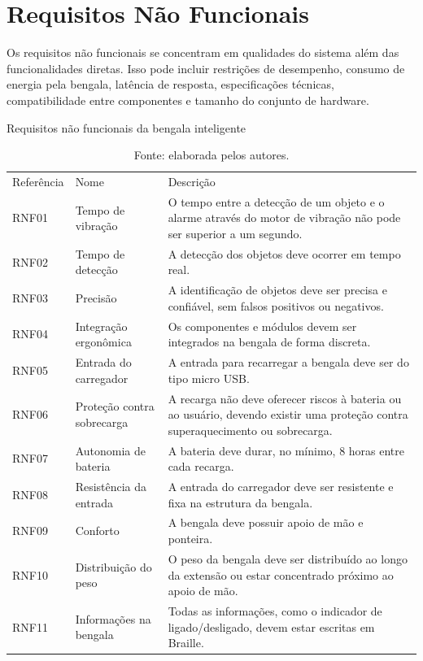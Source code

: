 \section{Requisitos Não Funcionais}
    Os requisitos não funcionais se concentram em qualidades do sistema além das funcionalidades diretas. Isso pode incluir restrições de desempenho, consumo de energia pela bengala, latência de resposta, especificações técnicas, compatibilidade entre componentes e tamanho do conjunto de hardware.


\begin{table}[!ht]    
    \captionsetup{width=1.0\textwidth} %
    \caption{Requisitos não funcionais da bengala inteligente}  
    \renewcommand{\arraystretch}{1.5} %
    \begin{tabular}{p{}p{}p{}} %
        \toprule
        Referência & Nome & Descrição \\
        RNF01 & Tempo de vibração & O tempo entre a detecção de um objeto e o alarme através do motor de vibração não pode ser superior a um segundo.   \\
        RNF02 & Tempo de detecção  & A detecção dos objetos deve ocorrer em tempo real. \\
        RNF03 & Precisão  &  A identificação de objetos deve ser precisa e confiável, sem falsos positivos ou negativos.  \\
        RNF04 & Integração ergonômica  &  Os componentes e módulos devem ser integrados na bengala de forma discreta.  \\
        RNF05 & Entrada do carregador  & A entrada para recarregar a bengala deve ser do tipo micro USB. \\
        RNF06 & Proteção contra sobrecarga  & A recarga não deve oferecer riscos à bateria ou ao usuário, devendo existir uma proteção contra superaquecimento ou sobrecarga.  \\
        RNF07 & Autonomia de bateria  &  A bateria deve durar, no mínimo, 8 horas entre cada recarga. \\
        RNF08 & Resistência da entrada  & A entrada do carregador deve ser resistente e fixa na estrutura da bengala. \\
        RNF09 & Conforto  &  A bengala deve possuir apoio de mão e ponteira.  \\
        RNF10 & Distribuição do peso &  O peso da bengala deve ser distribuído ao longo da extensão ou estar concentrado próximo ao apoio de mão.  \\
        RNF11 & Informações na bengala &  Todas as informações, como o indicador de ligado/desligado, devem estar escritas em Braille.  \\
        \bottomrule
    \end{tabular}
    \caption*{Fonte: elaborada pelos autores.} %
\end{table}

